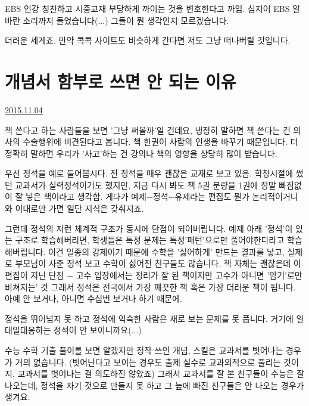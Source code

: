EBS 인강 칭찬하고 시중교재 부당하게 까이는 것을 변호한다고 까임.
심지어 EBS 알바란 소리까지 들었습니다(...)
그들이 뭔 생각인지 모르겠습니다.
\vspace{5mm}

더러운 세계죠. 만약 콕콕 사이트도 비슷하게 간다면 저도 그냥 떠나버릴 것입니다.
\vspace{5mm}






\section{개념서 함부로 쓰면 안 되는 이유}
\href{https://www.kockoc.com/Apoc/462860}{2015.11.04}

\vspace{5mm}

책 쓴다고 하는 사람들을 보면 '그냥 써볼까'일 건데요, 냉정히 말하면 책 쓴다는 건 의사의 수술행위에 비견된다고 봅니다.
책 한권이 사람의 인생을 바꾸기 때문입니다. 더 정확히 말하면 우리가 '사고'하는 건 강의나 책의 영향을 상당히 많이 받습니다.
\vspace{5mm}

우선 정석을 예로 들어봅시다. 전 정석을 매우 괜찮은 교재로 보고 있음.
학창시절에 썼던 교과서가 실력정석이기도 했지만, 지금 다시 봐도 책 5권 분량을 1권에 정말 빠짐없이 잘 넣은 책이라고 생각함.
게다가 예제$-$정석$-$유제라는 편집도 뭔가 논리적이거니와 이대로만 가면 일단 지식은 갖춰지죠.
\vspace{5mm}

그런데 정석의 저런 체계적 구조가 동시에 단점이 되어버립니다.
예제 아래 '정석'이 있는 구조로 학습해버리면, 학생들은 특정 문제는 특정'패턴'으로만 풀어야한다라고 학습해버립니다.
이건 일종의 강제이기 때문에 수학을 '싫어하게' 만드는 결과를 낳고, 실제로 부모님이 사준 정석 보고 수학이 싫어진 친구들도 많습니다.
책 자체는 괜찮은데 이 편집이 지닌 단점 $-$ 고수 입장에서는 정리가 잘 된 책이지만 고수가 아니면 '암기'로만 비쳐지는' 것
그래서 정석은 전국에서 가장 깨끗한 책 혹은 가장 더러운 책이 됩니다.
아예 안 보거나, 아니면 수십번 보거나 하기 때문에.
\vspace{5mm}

정석을 뛰어넘지 못 하고 정석에 익숙한 사람은 새로 보는 문제를 못 풉니다. 거기에 일대일대응하는 정석이 안 보이니까요(...)
\vspace{5mm}

수능 수학 기출 풀이를 보면 알겠지만 정작 쓰인 개념, 스킬은 교과서를 벗어나는 경우가 거의 없습니다.
(벗어난다고 보이는 경우도 출제 실수로 교과외적으로 풀리는 것이지, 교과서를 벗어나는 걸 의도하진 않았죠)
그래서 교과서를 잘 본 친구들이 수능은 잘 나오는데, 정석을 자기 것으로 만들지 못 하고 그 늪에 빠진 친구들은 안 나오는 경우가 생겨요.
\vspace{5mm}


